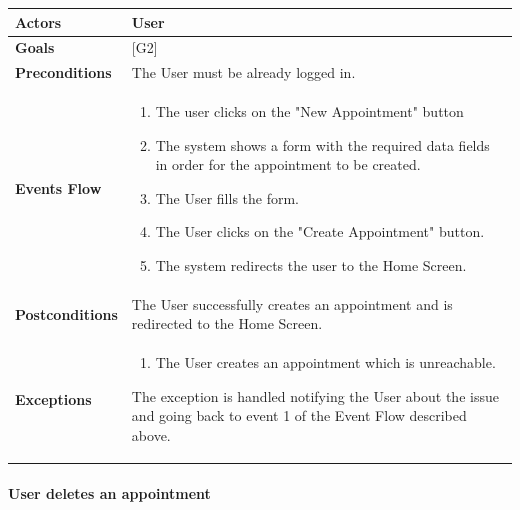 \documentclass[12pt]{article}
\begin{document}
\begin{center}
    \begin{tabular} { |p{}|p{}| }
        \hline
        \textbf{Actors} & User \\ 
        \hline
        \textbf{Goals} & {[G2]} \\ 
        \hline  
        \textbf{Preconditions} & The User must be already logged in. \\ 
        \hline
        \textbf{Events Flow} & \begin{enumerate} 
                            \setlength{\itemsep}{0.5pt}
                            \item The user clicks on the "New Appointment" button
                            \item The system shows a form with the required data fields in order for the appointment to be created.
                            \item The User fills the form.
                            \item The User clicks on the "Create Appointment" button.
                            \item The system redirects the user to the Home Screen.
                            \end{enumerate} \\
        \hline
        \textbf{Postconditions} & The User successfully creates an appointment and is redirected to the Home Screen. \\
        \hline
        \textbf{Exceptions} & \begin{enumerate} 
                            \setlength{\itemsep}{0.5pt}
                            \item The User creates an appointment which is unreachable.
                            \end{enumerate} 
                            The exception is handled notifying the User about the issue and going back to event 1 of the Event Flow described above.\\ 
        \hline
    \end{tabular}
\end{center}

\paragraph{User deletes an appointment}
\end{document}
